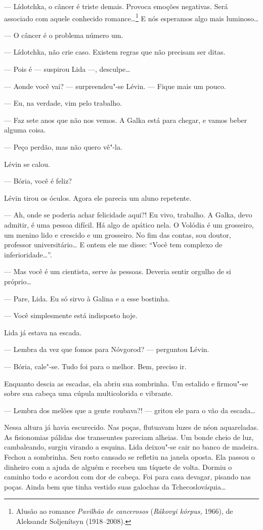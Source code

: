 --- Lídotchka, o câncer é triste demais. Provoca emoções negativas. Será
associado com aquele conhecido romance\ldots{}\footnote{Alusão ao romance
  \emph{Pavilhão de cancerosos} (\emph{Rákovyi kórpus,} 1966), de
  Aleksandr Soljenítsyn (1918--2008).} E nós esperamos algo mais
luminoso\ldots{}

--- O câncer é o problema número um.

--- Lídotchka, não crie caso. Existem regras que não precisam ser ditas.

--- Pois é --- suspirou Lida ---, desculpe\ldots{}

--- Aonde você vai? --- surpreendeu"-se Lévin. --- Fique mais um pouco.

--- Eu, na verdade, vim pelo trabalho.

--- Faz sete anos que não nos vemos. A Galka está para chegar, e vamos
beber alguma coisa.

--- Peço perdão, mas não quero vê"-la.

Lévin se calou.

--- Bória, você é feliz?

Lévin tirou os óculos. Agora ele parecia um aluno repetente.

--- Ah, onde se poderia achar felicidade aqui?! Eu vivo, trabalho. A
Galka, devo admitir, é uma pessoa difícil. Há algo de apático nela. O
Volódia é um grosseiro, um menino lido e crescido e um grosseiro. No fim
das contas, sou doutor, professor universitário\ldots{} E ontem ele me disse:
``Você tem complexo de inferioridade\ldots{}''.

--- Mas você é um cientista, serve às pessoas. Deveria sentir orgulho de
si próprio\ldots{}

--- Pare, Lida. Eu só sirvo à Galina e a esse bostinha.

--- Você simplesmente está indisposto hoje.

Lida já estava na escada.

--- Lembra da vez que fomos para Nóvgorod? --- perguntou Lévin.

--- Bória, cale"-se. Tudo foi para o melhor. Bem, preciso ir.

Enquanto descia as escadas, ela abriu sua sombrinha. Um estalido e
firmou"-se sobre sua cabeça uma cúpula multicolorida e vibrante.

--- Lembra dos melões que a gente roubava?! --- gritou ele para o vão da
escada\ldots{}

Nessa altura já havia escurecido. Nas poças, flutuavam luzes de néon
aquareladas. As fisionomias pálidas dos transeuntes pareciam alheias. Um
bonde cheio de luz, cambaleando, surgiu virando a esquina. Lida
deixou"-se cair no banco de madeira. Fechou a sombrinha. Seu rosto
cansado se refletiu na janela oposta. Ela passou o dinheiro com a ajuda
de alguém e recebeu um tíquete de volta. Dormiu o caminho todo e acordou
com dor de cabeça. Foi para casa devagar, pisando nas poças. Ainda bem
que tinha vestido suas galochas da Tchecoslováquia\ldots{}

